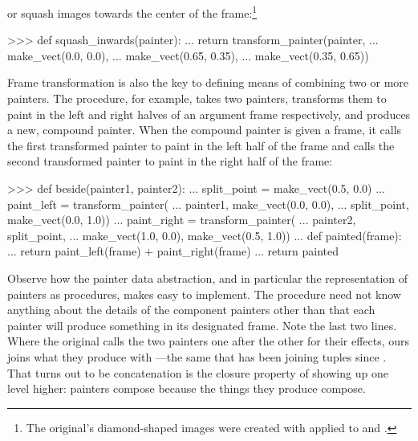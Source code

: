 \noindent
or squash images towards the center of the frame:\footnote{The original's
diamond-shaped images were created with  applied to
 and .}

\begin{codeBlock}
>>> def squash_inwards(painter):
...     return transform_painter(painter,
...                              make_vect(0.0, 0.0),
...                              make_vect(0.65, 0.35),
...                              make_vect(0.35, 0.65))
\end{codeBlock}

\noindent
Frame transformation is also the key to defining means of combining two or more
painters.  The  procedure, for example, takes two painters,
transforms them to paint in the left and right halves of an argument frame
respectively, and produces a new, compound painter.  When the compound painter
is given a frame, it calls the first transformed painter to paint in the left
half of the frame and calls the second transformed painter to paint in the
right half of the frame:

\begin{codeBlock}
>>> def beside(painter1, painter2):
...     split_point = make_vect(0.5, 0.0)
...     paint_left = transform_painter(
...         painter1, make_vect(0.0, 0.0),
...         split_point, make_vect(0.0, 1.0))
...     paint_right = transform_painter(
...         painter2, split_point,
...         make_vect(1.0, 0.0), make_vect(0.5, 1.0))
...     def painted(frame):
...         return paint_left(frame) + paint_right(frame)
...     return painted
\end{codeBlock}

\noindent
Observe how the painter data abstraction, and in particular the representation
of painters as procedures, makes  easy to implement.  The
 procedure need not know anything about the details of the
component painters other than that each painter will produce something in its
designated frame.  Note the last two lines.  Where the original calls the two
painters one after the other for their effects, ours joins what they produce
with \code{+}---the same \code{+} that has been joining tuples since
.  That  turns out to be concatenation is the
closure property of  showing up one level higher: painters
compose because the things they produce compose.


